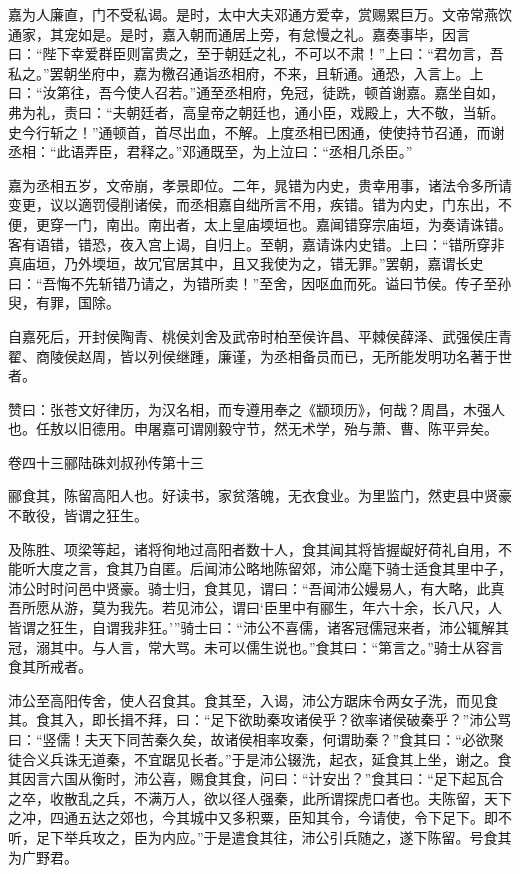 \documentclass[12pt,UTF8]{ctexbook}
\begin{document}
嘉为人廉直，门不受私谒。是时，太中大夫邓通方爱幸，赏赐累巨万。文帝常燕饮通家，其宠如是。是时，嘉入朝而通居上旁，有怠慢之礼。嘉奏事毕，因言曰：“陛下幸爱群臣则富贵之，至于朝廷之礼，不可以不肃！”上曰：“君勿言，吾私之。”罢朝坐府中，嘉为檄召通诣丞相府，不来，且斩通。通恐，入言上。上曰：“汝第往，吾今使人召若。”通至丞相府，免冠，徒跣，顿首谢嘉。嘉坐自如，弗为礼，责曰：“夫朝廷者，高皇帝之朝廷也，通小臣，戏殿上，大不敬，当斩。史今行斩之！”通顿首，首尽出血，不解。上度丞相已困通，使使持节召通，而谢丞相：“此语弄臣，君释之。”邓通既至，为上泣曰：“丞相几杀臣。”



嘉为丞相五岁，文帝崩，孝景即位。二年，晁错为内史，贵幸用事，诸法令多所请变更，议以適罚侵削诸侯，而丞相嘉自绌所言不用，疾错。错为内史，门东出，不便，更穿一门，南出。南出者，太上皇庙堧垣也。嘉闻错穿宗庙垣，为奏请诛错。客有语错，错恐，夜入宫上谒，自归上。至朝，嘉请诛内史错。上曰：“错所穿非真庙垣，乃外堧垣，故冗官居其中，且又我使为之，错无罪。”罢朝，嘉谓长史曰：“吾悔不先斩错乃请之，为错所卖！”至舍，因呕血而死。谥曰节侯。传子至孙臾，有罪，国除。



自嘉死后，开封侯陶青、桃侯刘舍及武帝时柏至侯许昌、平棘侯薛泽、武强侯庄青翟、商陵侯赵周，皆以列侯继踵，廉谨，为丞相备员而已，无所能发明功名著于世者。



赞曰：张苍文好律历，为汉名相，而专遵用奉之《颛顼历》，何哉？周昌，木强人也。任敖以旧德用。申屠嘉可谓刚毅守节，然无术学，殆与萧、曹、陈平异矣。





卷四十三郦陆硃刘叔孙传第十三



郦食其，陈留高阳人也。好读书，家贫落魄，无衣食业。为里监门，然吏县中贤豪不敢役，皆谓之狂生。



及陈胜、项梁等起，诸将徇地过高阳者数十人，食其闻其将皆握龊好荷礼自用，不能听大度之言，食其乃自匿。后闻沛公略地陈留郊，沛公麾下骑士适食其里中子，沛公时时问邑中贤豪。骑士归，食其见，谓曰：“吾闻沛公嫚易人，有大略，此真吾所愿从游，莫为我先。若见沛公，谓曰‘臣里中有郦生，年六十余，长八尺，人皆谓之狂生，自谓我非狂。’”骑士曰：“沛公不喜儒，诸客冠儒冠来者，沛公辄解其冠，溺其中。与人言，常大骂。未可以儒生说也。”食其曰：“第言之。”骑士从容言食其所戒者。



沛公至高阳传舍，使人召食其。食其至，入谒，沛公方踞床令两女子洗，而见食其。食其入，即长揖不拜，曰：“足下欲助秦攻诸侯乎？欲率诸侯破秦乎？”沛公骂曰：“竖儒！夫天下同苦秦久矣，故诸侯相率攻秦，何谓助秦？”食其曰：“必欲聚徒合义兵诛无道秦，不宜踞见长者。”于是沛公辍洗，起衣，延食其上坐，谢之。食其因言六国从衡时，沛公喜，赐食其食，问曰：“计安出？”食其曰：“足下起瓦合之卒，收散乱之兵，不满万人，欲以径人强秦，此所谓探虎口者也。夫陈留，天下之冲，四通五达之郊也，今其城中又多积粟，臣知其令，今请使，令下足下。即不听，足下举兵攻之，臣为内应。”于是遣食其往，沛公引兵随之，遂下陈留。号食其为广野君。
\end{document}
